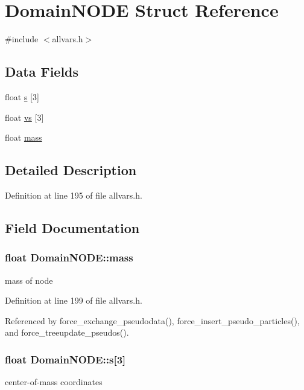 \hypertarget{structDomainNODE}{
\section{DomainNODE Struct Reference}
\label{structDomainNODE}
}


{\ttfamily \#include $<$allvars.h$>$}

\subsection*{Data Fields}
\begin{DoxyCompactItemize}
\item 
float \hyperlink{structDomainNODE_ae047a14ee5331dc9d6e128cb6c5e95e4}{s} \mbox{[}3\mbox{]}
\item 
float \hyperlink{structDomainNODE_a52c312bfff90fd7236c7d1e176c03d9c}{vs} \mbox{[}3\mbox{]}
\item 
float \hyperlink{structDomainNODE_afb739de9da1eb6908f9064093e02e7bc}{mass}
\end{DoxyCompactItemize}


\subsection{Detailed Description}


Definition at line 195 of file allvars.h.



\subsection{Field Documentation}
\hypertarget{structDomainNODE_afb739de9da1eb6908f9064093e02e7bc}{
\subsubsection[{mass}]{\setlength{\rightskip}{0pt plus 5cm}float {\bf DomainNODE::mass}}}
\label{structDomainNODE_afb739de9da1eb6908f9064093e02e7bc}
mass of node 

Definition at line 199 of file allvars.h.



Referenced by force\_\-exchange\_\-pseudodata(), force\_\-insert\_\-pseudo\_\-particles(), and force\_\-treeupdate\_\-pseudos().

\hypertarget{structDomainNODE_ae047a14ee5331dc9d6e128cb6c5e95e4}{
\subsubsection[{s}]{\setlength{\rightskip}{0pt plus 5cm}float {\bf DomainNODE::s}\mbox{[}3\mbox{]}}}
\label{structDomainNODE_ae047a14ee5331dc9d6e128cb6c5e95e4}
center-\/of-\/mass coordinates 

